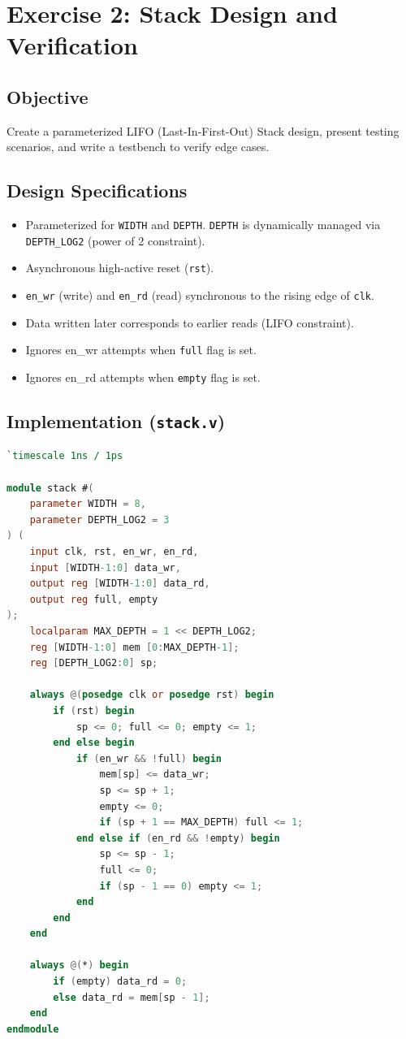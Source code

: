 \documentclass[12pt,a4paper]{article}
\begin{document}
\section{Exercise 2: Stack Design and Verification}

\subsection{Objective}
Create a parameterized LIFO (Last-In-First-Out) Stack design, present testing scenarios, and write a testbench to verify edge cases.

\subsection{Design Specifications}
\begin{itemize}
    \item Parameterized for \texttt{WIDTH} and \texttt{DEPTH}. \texttt{DEPTH} is dynamically managed via \texttt{DEPTH\_LOG2} (power of 2 constraint).
    \item Asynchronous high-active reset (\texttt{rst}).
    \item \texttt{en\_wr} (write) and \texttt{en\_rd} (read) synchronous to the rising edge of \texttt{clk}.
    \item Data written later corresponds to earlier reads (LIFO constraint).
    \item Ignores en\_wr attempts when \texttt{full} flag is set.
    \item Ignores en\_rd attempts when \texttt{empty} flag is set.
\end{itemize}

\subsection{Implementation (\texttt{stack.v})}
\begin{lstlisting}[language=Verilog]
`timescale 1ns / 1ps

module stack #(
    parameter WIDTH = 8,
    parameter DEPTH_LOG2 = 3
) (
    input clk, rst, en_wr, en_rd,
    input [WIDTH-1:0] data_wr,
    output reg [WIDTH-1:0] data_rd,
    output reg full, empty
);
    localparam MAX_DEPTH = 1 << DEPTH_LOG2;
    reg [WIDTH-1:0] mem [0:MAX_DEPTH-1];
    reg [DEPTH_LOG2:0] sp;

    always @(posedge clk or posedge rst) begin
        if (rst) begin
            sp <= 0; full <= 0; empty <= 1;
        end else begin
            if (en_wr && !full) begin
                mem[sp] <= data_wr;
                sp <= sp + 1;
                empty <= 0;
                if (sp + 1 == MAX_DEPTH) full <= 1;
            end else if (en_rd && !empty) begin
                sp <= sp - 1;
                full <= 0;
                if (sp - 1 == 0) empty <= 1;
            end
        end
    end

    always @(*) begin
        if (empty) data_rd = 0;
        else data_rd = mem[sp - 1];
    end
endmodule
\end{lstlisting}
\end{document}
